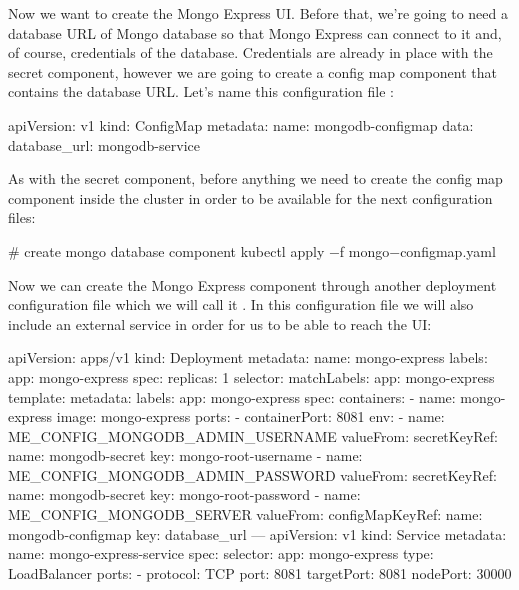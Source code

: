 Now we want to create the Mongo Express UI. Before that, we're going to need a database URL of Mongo database so that
Mongo Express can connect to it and, of course, credentials of the database. Credentials are already in place with
the secret component, however we are going to create a config map component that contains the database URL. Let's
name this configuration file :

\begin{block}
apiVersion: v1
kind: ConfigMap
metadata:
  name: mongodb-configmap
data:
  database_url: mongodb-service
\end{block}

As with the secret component, before anything we need to create the config map component inside the cluster in order
to be available for the next configuration files:

\begin{bash}
# create mongo database component
kubectl apply $-$f mongo$-$configmap.yaml
\end{bash}

Now we can create the Mongo Express component through another deployment configuration file which we will call it
. In this configuration file we will also include an external service in order for us to be
able to reach the UI:

\begin{block}
apiVersion: apps/v1
kind: Deployment
metadata:
  name: mongo-express
  labels:
    app: mongo-express
spec:
  replicas: 1
  selector:
    matchLabels:
      app: mongo-express
  template:
    metadata:
      labels:
        app: mongo-express
    spec:
      containers:
      - name: mongo-express
        image: mongo-express
        ports:
        - containerPort: 8081
        env:
        - name: ME_CONFIG_MONGODB_ADMIN_USERNAME
          valueFrom:
            secretKeyRef:
              name: mongodb-secret
              key: mongo-root-username
        - name: ME_CONFIG_MONGODB_ADMIN_PASSWORD
          valueFrom:
            secretKeyRef:
              name: mongodb-secret
              key: mongo-root-password
        - name: ME_CONFIG_MONGODB_SERVER
          valueFrom:
            configMapKeyRef:
              name: mongodb-configmap
              key: database_url
---
apiVersion: v1
kind: Service
metadata:
  name: mongo-express-service
spec:
  selector:
    app: mongo-express
  type: LoadBalancer
  ports:
    - protocol: TCP
      port: 8081
      targetPort: 8081
      nodePort: 30000
\end{block}

